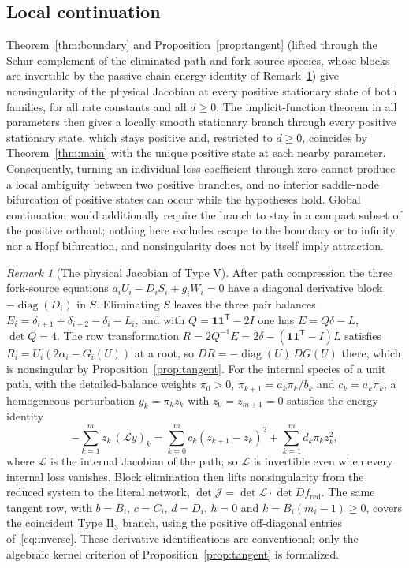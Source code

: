 \documentclass[11pt,a4paper]{article}
\theoremstyle{plain}
\theoremstyle{definition}
\theoremstyle{remark}
\newtheorem{remark}[theorem]{Remark}
\numberwithin{equation}{section}
\newcommand{\one}{\mathbf{1}}
\newcommand{\diag}{\operatorname{diag}}
\newcommand{\II}{\mathrm{II}}
\newcommand{\V}{\mathrm{V}}
\begin{document}
\subsection{Local continuation}
Theorem~\ref{thm:boundary} and Proposition~\ref{prop:tangent} (lifted through the Schur complement of the eliminated path and fork-source species, whose blocks are invertible by the passive-chain energy identity of Remark~\ref{rem:lift}) give nonsingularity of the physical Jacobian at every positive stationary state of both families, for all rate constants and all $d\ge0$. The implicit-function theorem in all parameters then gives a locally smooth stationary branch through every positive stationary state, which stays positive and, restricted to $d\ge0$, coincides by Theorem~\ref{thm:main} with the unique positive state at each nearby parameter. Consequently, turning an individual loss coefficient through zero cannot produce a local ambiguity between two positive branches, and no interior saddle-node bifurcation of positive states can occur while the hypotheses hold. Global continuation would additionally require the branch to stay in a compact subset of the positive orthant; nothing here excludes escape to the boundary or to infinity, nor a Hopf bifurcation, and nonsingularity does not by itself imply attraction.

\begin{remark}[The physical Jacobian of Type $\V$]\label{rem:lift}
After path compression the three fork-source equations $a_iU_i-D_iS_i+g_iW_i=0$ have a diagonal derivative block $-\diag(D_i)$ in $S$. Eliminating $S$ leaves the three pair balances $E_i=\delta_{i+1}+\delta_{i+2}-\delta_i-L_i$, and with $Q=\one\one^{\mathsf T}-2I$ one has $E=Q\delta-L$, $\det Q=4$. The row transformation $R=2Q^{-1}E=2\delta-(\one\one^{\mathsf T}-I)L$ satisfies $R_i=U_i(2\alpha_i-G_i(U))$ at a root, so $DR=-\diag(U)\,DG(U)$ there, which is nonsingular by Proposition~\ref{prop:tangent}. For the internal species of a unit path, with the detailed-balance weights $\pi_0>0$, $\pi_{k+1}=a_k\pi_k/b_k$ and $c_k=a_k\pi_k$, a homogeneous perturbation $y_k=\pi_kz_k$ with $z_0=z_{m+1}=0$ satisfies the energy identity
\[
-\sum_{k=1}^mz_k\,(\mathcal Ly)_k=\sum_{k=0}^mc_k(z_{k+1}-z_k)^2+\sum_{k=1}^md_k\pi_kz_k^2,
\]
where $\mathcal L$ is the internal Jacobian of the path; so $\mathcal L$ is invertible even when every internal loss vanishes. Block elimination then lifts nonsingularity from the reduced system to the literal network, $\det\mathcal J=\det\mathcal L\cdot\det Df_{\mathrm{red}}$. The same tangent row, with $b=B_i$, $c=C_i$, $d=D_i$, $h=0$ and $k=B_i(m_i-1)\ge0$, covers the coincident Type $\II_3$ branch, using the positive off-diagonal entries of~\eqref{eq:inverse}. These derivative identifications are conventional; only the algebraic kernel criterion of Proposition~\ref{prop:tangent} is formalized.
\end{remark}
\end{document}
